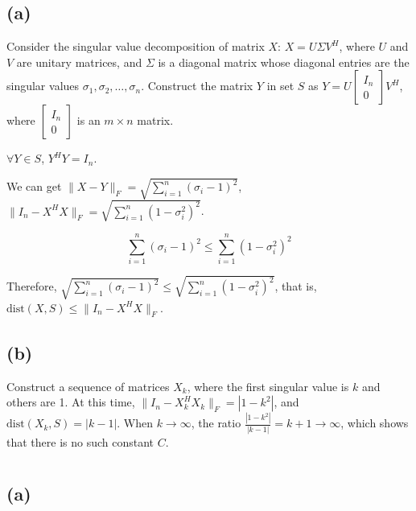 \documentclass{article}
\begin{document}
\section{}

\subsection*{(a)} 

Consider the singular value decomposition of matrix $ X $: $ X = U\Sigma V^H $, where $ U $ and $ V $ are unitary matrices, and $ \Sigma $ is a diagonal matrix whose diagonal entries are the singular values $ \sigma_1, \sigma_2, \ldots, \sigma_n $. Construct the matrix $ Y $ in set $ S $ as $ Y = U\begin{bmatrix}I_n\\0\end{bmatrix}V^H $, where $ \begin{bmatrix}I_n\\0\end{bmatrix} $ is an $ m\times n $ matrix.

$ \forall Y\in S $, $ Y^H Y = I_n $.

We can get $ \|X - Y\|_F=\sqrt{\sum_{i = 1}^n(\sigma_i - 1)^2} $, $ \|I_n - X^H X\|_F = \sqrt{\sum_{i = 1}^n(1 - \sigma_i^2)^2} $.

$$
\sum_{i = 1}^n(\sigma_i - 1)^2\leq\sum_{i = 1}^n(1 - \sigma_i^2)^2
$$

Therefore, $ \sqrt{\sum_{i = 1}^n(\sigma_i - 1)^2}\leq\sqrt{\sum_{i = 1}^n(1 - \sigma_i^2)^2} $, that is, $ \text{dist}(X, S)\leq\|I_n - X^H X\|_F $.

\subsection*{(b)} 

Construct a sequence of matrices $ X_k $, where the first singular value is $ k $ and others are 1. At this time, $ \|I_n - X_k^H X_k\|_F = |1 - k^2| $, and $ \text{dist}(X_k, S)=|k - 1| $. When $ k\to\infty $, the ratio $ \frac{|1 - k^2|}{|k - 1|}=k + 1\to\infty $, which shows that there is no such constant $ C $.

\section{}

\subsection*{(a)} 
\end{document}
